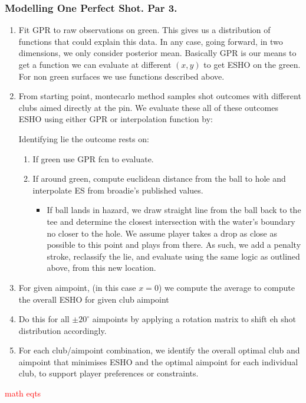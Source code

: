 \documentclass[11pt, letterpaper]{article}
\begin{document}
\subsubsection{Modelling One Perfect Shot. Par 3.}
\begin{enumerate}
    \item Fit GPR to raw observations on green. This gives us a distribution of functions that could explain this data. In any case, going forward, in two dimensions, we only consider posterior mean. Basically GPR is our means to get a function we can evaluate at different $(x,y)$ to get ESHO on the green. For non green surfaces we use functions described above. 
    \item From starting point, montecarlo method samples shot outcomes with different clubs aimed directly at the pin. We evaluate these all of these outcomes ESHO using either GPR or interpolation function by: 

     Identifying lie the outcome rests on:
        \begin{enumerate}
            \item If green use GPR fcn to evaluate.
            \item If around green, compute euclidean distance from the ball to hole and interpolate ES from broadie's published values.
            \begin{itemize}
                 \item If ball lands in hazard, we draw straight line from the ball back to the tee and determine the closest intersection with the water's boundary no closer to the hole. We assume player takes a drop as close as possible to this point and plays from there. As such, we add a penalty stroke, reclassify the lie, and evaluate using the same logic as outlined above, from this new location.
            \end{itemize}
        \end{enumerate}
    \item For given aimpoint, (in this case $x= 0$) we compute the average to compute the overall ESHO for given club aimpoint
    \item Do this for all $\pm 20^\circ$ aimpoints by applying a rotation matrix to shift eh shot distribution accordingly.
    \item For each club/aimpoint combination, we identify the overall optimal club and aimpoint that minimises ESHO and the optimal aimpoint for each individual club, to support player preferences or constraints.
\end{enumerate}
\textcolor{red}{math eqts}
\end{document}

